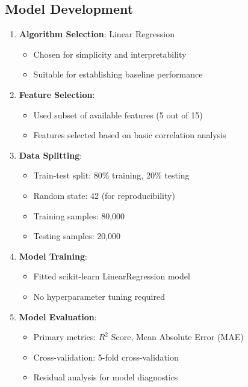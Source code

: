 \documentclass[12pt,a4paper]{article}
\begin{document}
\subsection{Model Development}
\begin{enumerate}
    \item \textbf{Algorithm Selection}: Linear Regression
    \begin{itemize}
        \item Chosen for simplicity and interpretability
        \item Suitable for establishing baseline performance
    \end{itemize}
    
    \item \textbf{Feature Selection}: 
    \begin{itemize}
        \item Used subset of available features (5 out of 15)
        \item Features selected based on basic correlation analysis
    \end{itemize}

    \item \textbf{Data Splitting}:
    \begin{itemize}
        \item Train-test split: 80\% training, 20\% testing
        \item Random state: 42 (for reproducibility)
        \item Training samples: 80,000
        \item Testing samples: 20,000
    \end{itemize}

    \item \textbf{Model Training}:
    \begin{itemize}
        \item Fitted scikit-learn LinearRegression model
        \item No hyperparameter tuning required
    \end{itemize}

    \item \textbf{Model Evaluation}:
    \begin{itemize}
        \item Primary metrics: $R^2$ Score, Mean Absolute Error (MAE)
        \item Cross-validation: 5-fold cross-validation
        \item Residual analysis for model diagnostics
    \end{itemize}
\end{enumerate}
\end{document}
